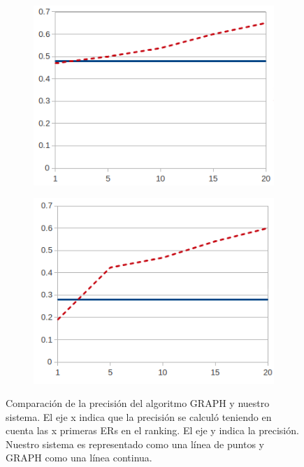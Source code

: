 \begin{figure}[H]
\begin{subfigure}{.6\textwidth}
  \centering
\includegraphics[width=\textwidth]{images/furniturePrec.png}
\caption{}
\end{subfigure}
  \centering
\begin{subfigure}{.6\textwidth}
\centering
\includegraphics[width=\textwidth]{images/precP.png}
\caption{}
\end{subfigure}
\caption{Comparaci\'on de la precisi\'on  del algoritmo GRAPH y nuestro sistema. El eje x indica que la precisi\'on se calcul\'o teniendo en cuenta las x primeras ERs en el ranking. El eje y indica la precisi\'on. Nuestro sistema es representado como una l\'inea de puntos y GRAPH como una l\'inea continua.\label{graficoPresicion}}
\end{figure}

